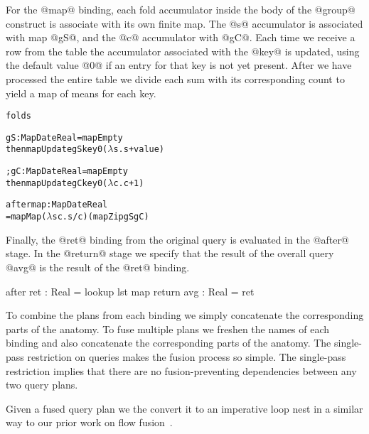 For the @map@ binding, each fold accumulator inside the body of the @group@ construct is associate with its own finite map. The @s@ accumulator is associated with map @gS@, and the @c@ accumulator with @gC@. Each time we receive a row from the table the accumulator associated with the @key@ is updated, using the default value @0@ if an entry for that key is not yet present. After we have processed the entire table we divide each sum with its corresponding count to yield a map of means for each key.
\begin{alltt}
  folds  { gS  : Map Date Real = mapEmpty
           then mapUpdate gS key 0 (\(\lambda\)s. s + value)

         ; gC  : Map Date Real = mapEmpty
           then mapUpdate gC key 0 (\(\lambda\)c. c + 1) }

  after  { map : Map Date Real
            = mapMap (\(\lambda\)s c. s / c) (mapZip gS gC) }
\end{alltt}


Finally, the @ret@ binding from the original query is evaluated in the @after@ stage. In the @return@ stage we specify that the result of the overall query @avg@ is the result of the @ret@ binding.
\begin{code}
  after  { ret : Real = lookup lst map }
  return { avg : Real = ret }
\end{code}

To combine the plans from each binding we simply concatenate the corresponding parts of the anatomy. To fuse multiple plans we freshen the names of each binding and also concatenate the corresponding parts of the anatomy. The single-pass restriction on queries makes the fusion process so simple. The single-pass restriction implies that there are no fusion-preventing dependencies between any two query plans. 

Given a fused query plan we the convert it to an imperative loop nest in a similar way to our prior work on flow fusion~\cite{lippmeier2013data}.

